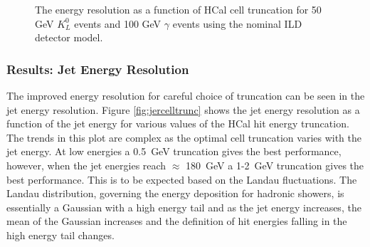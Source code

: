 \begin{figure}[h!]
\caption[The energy resolution as a function of HCal cell truncation for \protect{} 50 GeV $K^{0}_{L}$ events and \protect{} 100 GeV $\gamma$ events using the nominal ILD detector model.]{The energy resolution as a function of HCal cell truncation for \protect{} 50 GeV $K^{0}_{L}$ events and \protect{} 100 GeV $\gamma$ events using the nominal ILD detector model.}
\label{fig:ercelltrunc}
\end{figure}


\subsubsection{Results: Jet Energy Resolution}

The improved energy resolution for careful choice of truncation can be seen in the jet energy resolution.  Figure \ref{fig:jercelltrunc} shows the jet energy resolution as a function of the jet energy for various values of the HCal hit energy truncation.  The trends in this plot are complex as the optimal cell truncation varies with the jet energy.  At low energies a 0.5~GeV truncation gives the best performance, however, when the jet energies reach $\approx$ 180~GeV a 1-2~GeV truncation gives the best performance.  This is to be expected based on the Landau fluctuations.  The Landau distribution, governing the energy deposition for hadronic showers, is essentially a Gaussian with a high energy tail and as the jet energy increases, the mean of the Gaussian increases and the definition of hit energies falling in the high energy tail changes.  

